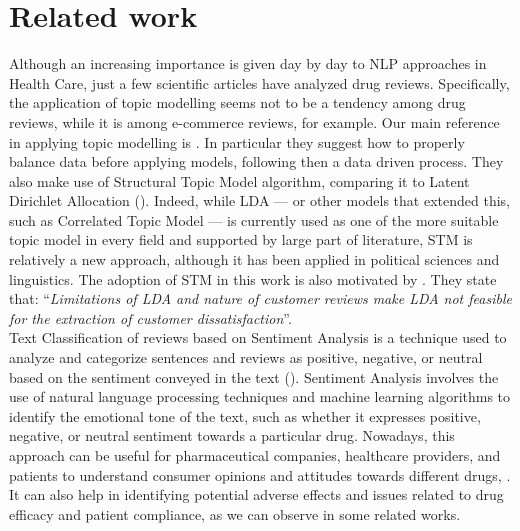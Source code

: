 \documentclass[10pt, a4paper, twocolumn]{article}
\begin{document}
    \section{Related work}
        Although an increasing importance is given day by day to NLP approaches in Health Care, just a few scientific articles have analyzed drug reviews. Specifically, the application of topic modelling seems not to be a tendency among drug reviews, while it is among e-commerce reviews, for example. Our main reference in applying topic modelling is \cite{drug}. In particular they suggest how to properly balance data before applying models, following then a data driven process. They also make use of Structural Topic Model algorithm, comparing it to Latent Dirichlet Allocation (\cite{LDA}). Indeed, while LDA --- or other models that extended this, such as Correlated Topic Model --- is currently used as one of the more suitable topic model in every field and supported by large part of literature, STM is relatively a new approach, although it has been applied in political sciences and linguistics. The adoption of STM in this work is also motivated by \cite{hotel}. They state that: ``\textit{Limitations of LDA and nature of customer reviews make LDA not feasible for the extraction of customer dissatisfaction}''.\\
        
        Text Classification of reviews based on Sentiment Analysis is a technique used to analyze and categorize sentences and reviews as positive, negative, or neutral based on the sentiment conveyed in the text (\cite{Kaggle_choco, Kaggle_Peter}).
        Sentiment Analysis involves the use of natural language processing techniques and machine learning algorithms to identify the emotional tone of the text, such as whether it expresses positive, negative, or neutral sentiment towards a particular drug. Nowadays, this approach can be useful for pharmaceutical companies, healthcare providers, and patients to understand consumer opinions and attitudes towards different drugs, \cite{drug2} . It can also help in identifying potential adverse effects and issues related to drug efficacy and patient compliance, as we can observe in some related works.
        
\end{document}
